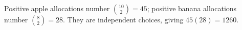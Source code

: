 Positive apple allocations number $\binom{10}2=45$; positive banana allocations number $\binom82=28$. They are independent choices, giving $45(28)=\boxed{1260}$.
